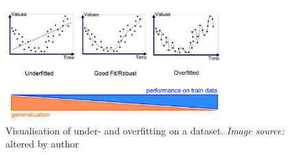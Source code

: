 \begin{figure}[h]
   \centering
   \includegraphics[width=0.75\textwidth]{img/over_underfitting}
   \caption{Visualisation of under- and overfitting on a dataset. \textit{Image source:} \parencite{Bhande2018} altered by author}
   \label{fig:over_underfitting}
\end{figure}

\vspace{1cm}

